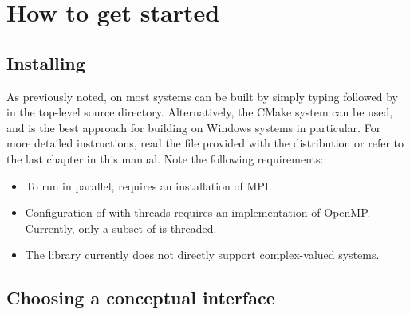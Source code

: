 
\section{How to get started}

\subsection{Installing \hypre{}}

As previously noted, on most systems \hypre{} can be built by simply typing
 followed by  in the top-level source directory.
Alternatively, the CMake system \cite{CMakeWebPage} can be used, and is the best
approach for building \hypre{} on Windows systems in particular.  For more
detailed instructions, read the  file provided with the \hypre{}
distribution or refer to the last chapter in this manual.  Note the following
requirements:

\begin{itemize}

\item To run in parallel, \hypre{} requires an installation of MPI.

\item Configuration of \hypre{} with threads requires an implementation
of OpenMP.  Currently, only a subset of \hypre{} is threaded.

\item The \hypre{} library currently does not directly support complex-valued
systems.

\end{itemize}

\subsection{Choosing a conceptual interface}

